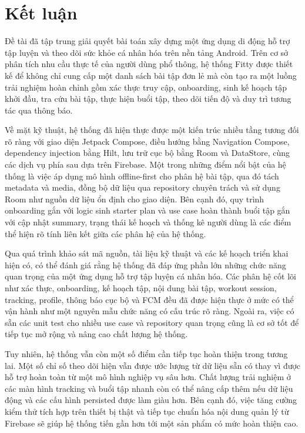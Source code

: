 \chapter*{Kết luận}

Đề tài đã tập trung giải quyết bài toán xây dựng một ứng dụng di động hỗ trợ tập luyện và theo dõi sức khỏe cá nhân hóa trên nền tảng Android. Trên cơ sở phân tích nhu cầu thực tế của người dùng phổ thông, hệ thống Fitty được thiết kế để không chỉ cung cấp một danh sách bài tập đơn lẻ mà còn tạo ra một luồng trải nghiệm hoàn chỉnh gồm xác thực truy cập, onboarding, sinh kế hoạch tập khởi đầu, tra cứu bài tập, thực hiện buổi tập, theo dõi tiến độ và duy trì tương tác qua thông báo.

Về mặt kỹ thuật, hệ thống đã hiện thực được một kiến trúc nhiều tầng tương đối rõ ràng với giao diện Jetpack Compose, điều hướng bằng Navigation Compose, dependency injection bằng Hilt, lưu trữ cục bộ bằng Room và DataStore, cùng các dịch vụ phía sau dựa trên Firebase. Một trong những điểm nổi bật của hệ thống là việc áp dụng mô hình offline-first cho phân hệ bài tập, qua đó tách metadata và media, đồng bộ dữ liệu qua repository chuyên trách và sử dụng Room như nguồn dữ liệu ổn định cho giao diện. Bên cạnh đó, quy trình onboarding gắn với logic sinh starter plan và use case hoàn thành buổi tập gắn với cập nhật summary, trạng thái kế hoạch và thống kê người dùng là các điểm thể hiện rõ tính liên kết giữa các phân hệ của hệ thống.

Qua quá trình khảo sát mã nguồn, tài liệu kỹ thuật và các kế hoạch triển khai hiện có, có thể đánh giá rằng hệ thống đã đáp ứng phần lớn những chức năng quan trọng của một ứng dụng hỗ trợ tập luyện cá nhân hóa. Các phân hệ cốt lõi như xác thực, onboarding, kế hoạch tập, nội dung bài tập, workout session, tracking, profile, thông báo cục bộ và FCM đều đã được hiện thực ở mức có thể vận hành như một nguyên mẫu chức năng có cấu trúc rõ ràng. Ngoài ra, việc có sẵn các unit test cho nhiều use case và repository quan trọng cũng là cơ sở tốt để tiếp tục mở rộng và nâng cao chất lượng hệ thống.

Tuy nhiên, hệ thống vẫn còn một số điểm cần tiếp tục hoàn thiện trong tương lai. Một số chỉ số theo dõi hiện vẫn được ước lượng từ dữ liệu sẵn có thay vì được hỗ trợ hoàn toàn từ một mô hình nghiệp vụ sâu hơn. Chất lượng trải nghiệm ở các màn hình tracking và buổi tập nhanh còn có thể nâng cấp thêm nếu dữ liệu động và các cấu hình persisted được làm giàu hơn. Bên cạnh đó, việc tăng cường kiểm thử tích hợp trên thiết bị thật và tiếp tục chuẩn hóa nội dung quản lý từ Firebase sẽ giúp hệ thống tiến gần hơn tới một sản phẩm có mức hoàn thiện cao.

